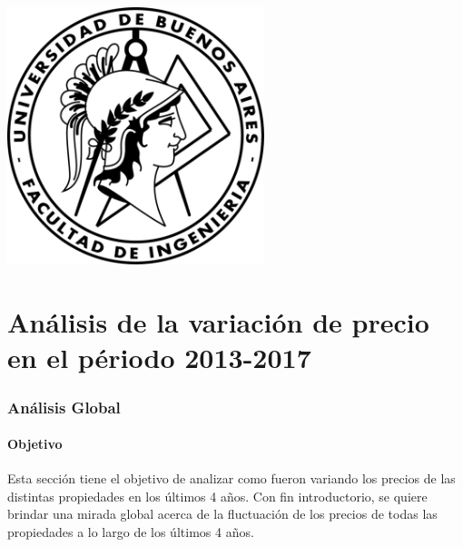 \documentclass[a4paper, 10pt]{article}
\begin{document}
    \newpage

    \begin{center}
        \includegraphics[width=7.5cm, height=7.5cm]{images/logo}
    \end{center}


    \maketitle
    \newpage
    \tableofcontents
    \newpage
	\part{Análisis de la variación de precio en el périodo 2013-2017}

		\section{Análisis Global}

      \subsection{Objetivo}

        Esta sección tiene el objetivo de analizar como fueron variando los precios de las distintas propiedades en los últimos 4 años. Con fin introductorio, se quiere brindar una mirada global acerca de la fluctuación de los precios de todas las propiedades a lo largo de los últimos 4 años.
\end{document}
